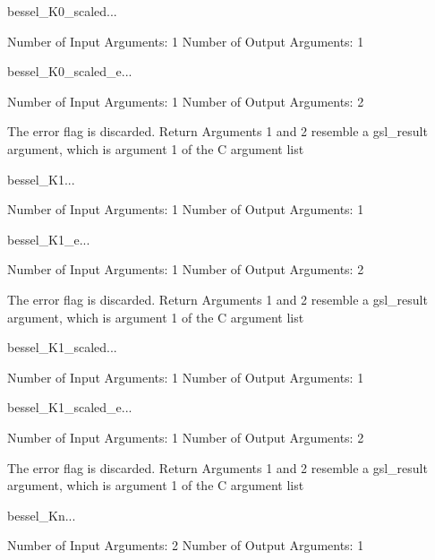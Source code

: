 \begin{funcdesc}{bessel_K0_scaled}{...}

    Number of Input  Arguments:  1
    Number of Output Arguments:  1
\end{funcdesc}

\begin{funcdesc}{bessel_K0_scaled_e}{...}

    Number of Input  Arguments:  1
    Number of Output Arguments:  2

The error flag is discarded.
Return Arguments 1 and 2 resemble a gsl_result argument,
	which is  argument 1 of the C argument list

\end{funcdesc}

\begin{funcdesc}{bessel_K1}{...}

    Number of Input  Arguments:  1
    Number of Output Arguments:  1
\end{funcdesc}

\begin{funcdesc}{bessel_K1_e}{...}

    Number of Input  Arguments:  1
    Number of Output Arguments:  2

The error flag is discarded.
Return Arguments 1 and 2 resemble a gsl_result argument,
	which is  argument 1 of the C argument list

\end{funcdesc}

\begin{funcdesc}{bessel_K1_scaled}{...}

    Number of Input  Arguments:  1
    Number of Output Arguments:  1
\end{funcdesc}

\begin{funcdesc}{bessel_K1_scaled_e}{...}

    Number of Input  Arguments:  1
    Number of Output Arguments:  2

The error flag is discarded.
Return Arguments 1 and 2 resemble a gsl_result argument,
	which is  argument 1 of the C argument list

\end{funcdesc}

\begin{funcdesc}{bessel_Kn}{...}

    Number of Input  Arguments:  2
    Number of Output Arguments:  1
\end{funcdesc}

